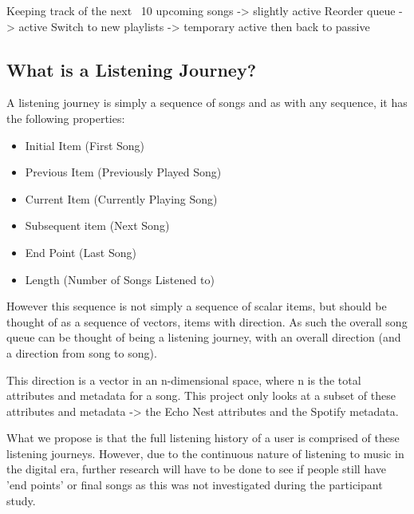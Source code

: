 Keeping track of the next ~10 upcoming songs -> slightly active
Reorder queue -> active
Switch to new playlists -> temporary active then back to passive

\subsection{What is a Listening Journey?}
A listening journey is simply a sequence of songs and as with any sequence, it has the following properties:\begin{itemize}
    \item Initial Item (First Song)
    \item Previous Item (Previously Played Song)
    \item Current Item (Currently Playing Song)
    \item Subsequent item (Next Song)
    \item End Point (Last Song)
    \item Length (Number of Songs Listened to)
\end{itemize}

However this sequence is not simply a sequence of scalar items, but should be thought of as a sequence of vectors, items with direction. As such the overall song queue can be thought of being a listening journey, with an overall direction (and a direction from song to song).

This direction is a vector in an n-dimensional space, where n is the total attributes and metadata for a song. This project only looks at a subset of these attributes and metadata -> the Echo Nest attributes and the Spotify metadata.

What we propose is that the full listening history of a user is comprised of these listening journeys.
However, due to the continuous nature of listening to music in the digital era, further research will have to be done to see if people still have 'end points' or final songs as this was not investigated during the participant study.

